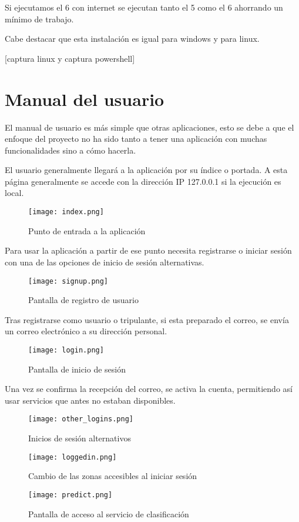 Si ejecutamos el 6 con internet se ejecutan tanto el 5 como el 6 ahorrando un mínimo de trabajo.

Cabe destacar que esta instalación es igual para windows y para linux.
 
[captura linux y captura powershell]


\section{Manual del usuario}
El manual de usuario es más simple que otras aplicaciones, esto se debe a que el enfoque del proyecto no ha sido tanto a tener una aplicación con muchas funcionalidades sino a cómo hacerla.

El usuario generalmente llegará a la aplicación por su índice o portada. A esta página generalmente se accede con la dirección IP 127.0.0.1 si la ejecución es local.


\begin{figure}
	\centering
	\texttt{[image: index.png]}
	\caption{Punto de entrada a la aplicación}\label{fig:index.png}
\end{figure}

Para usar la aplicación a partir de ese punto necesita registrarse o iniciar sesión con una de las opciones de inicio de sesión alternativas.

\begin{figure}
	\centering
	\texttt{[image: signup.png]}
	\caption{Pantalla de registro de usuario}\label{fig:signup.png}
\end{figure}

Tras registrarse como usuario o tripulante, si esta preparado el correo, se envía un correo electrónico a su dirección personal.

\begin{figure}
	\centering
	\texttt{[image: login.png]}
	\caption{Pantalla de inicio de sesión}\label{fig:login.png}
\end{figure}

Una vez se confirma la recepción del correo, se activa la cuenta, permitiendo así usar servicios que antes no estaban disponibles.

\begin{figure}
	\centering
	\texttt{[image: other\_logins.png]}
	\caption{Inicios de sesión alternativos}\label{fig:other_logins.png}
\end{figure}


\begin{figure}
	\centering
	\texttt{[image: loggedin.png]}
	\caption{Cambio de las zonas accesibles al iniciar sesión}\label{fig:loggedin.png}
\end{figure}


\begin{figure}
	\centering
	\texttt{[image: predict.png]}
	\caption{Pantalla de acceso al servicio de clasificación}\label{fig:predict.png}
\end{figure}






